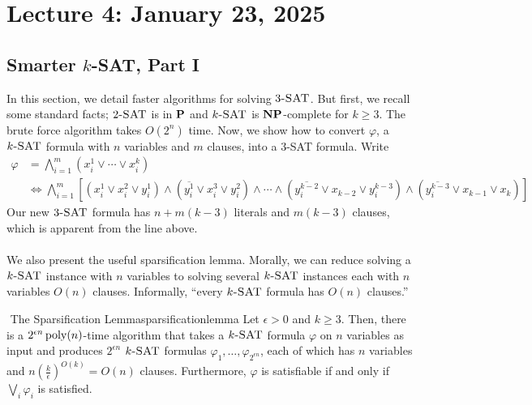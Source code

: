 \pagebreak

\section{Lecture 4: January 23, 2025}

    \subsection{Smarter \(k\)-SAT, Part I}

        In this section, we detail faster algorithms for solving \(3\textsc{-SAT}\). But first, we recall some standard facts; \(2\textsc{-SAT}\) is in \(\mathbf{P}\) and \(k\textsc{-SAT}\) is \(\mathbf{NP}\)-complete for \(k\geq3\). The brute force algorithm takes \(O(2^n)\) time. Now, we show how to convert \(\varphi\), a \(k\textsc{-SAT}\) formula with \(n\) variables and \(m\) clauses, into a \(3\)-\textsc{SAT} formula. Write
        \begin{align*}
            \varphi&=\bigwedge_{i=1}^m \left(x_i^1\vee \cdots \vee x_i^k\right) \\
            &\iff\bigwedge_{i=1}^m \left[(x_i^1\vee x_i^2\vee y_i^1)\wedge \left(\overline{y_i^1}\vee x_i^3\vee y_i^2\right)\wedge\cdots\wedge\left(\overline{y_i^{k-2}}\vee x_{k-2}\vee y_i^{k-3}\right)\wedge\left(\overline{y_i^{k-3}}\vee x_{k-1}\vee x_k\right)\right]
        \end{align*}
        Our new \(3\textsc{-SAT}\) formula has \(n+m(k-3)\) literals and \(m(k-3)\) clauses, which is apparent from the line above.
        \\
        \\
        We also present the useful sparsification lemma. Morally, we can reduce solving a \(k\textsc{-SAT}\) instance with \(n\) variables to solving several \(k\textsc{-SAT}\) instances each with \(n\) variables \(O(n)\) clauses. Informally, ``every \(k\textsc{-SAT}\) formula has \(O(n)\) clauses.''
        \begin{theorem}{\Stop\,\,The Sparsification Lemma}{sparsificationlemma}
            Let \(\epsilon>0\) and \(k\geq3\). Then, there is a \(2^{\epsilon n}\operatorname{poly}(n)\)-time algorithm that takes a \(k\textsc{-SAT}\) formula \(\varphi\) on \(n\) variables as input and produces \(2^{\epsilon n}\) \(k\textsc{-SAT}\) formulas \(\varphi_1,\ldots,\varphi_{2^{\epsilon n}}\), each of which has \(n\) variables and \(n\left(\frac{k}{\epsilon}\right)^{O(k)}=O(n)\) clauses. Furthermore, \(\varphi\) is satisfiable if and only if \(\bigvee_i \varphi_i\) is satisfied.
        \end{theorem}
